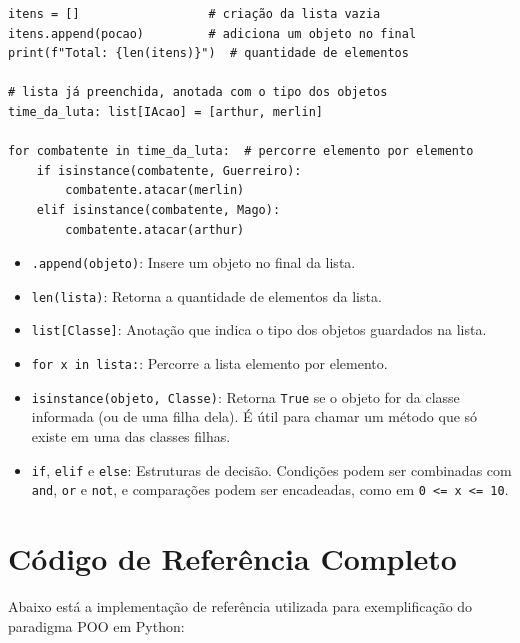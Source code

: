 \begin{lstlisting}[style=python]
itens = []                  # criação da lista vazia
itens.append(pocao)         # adiciona um objeto no final
print(f"Total: {len(itens)}")  # quantidade de elementos

# lista já preenchida, anotada com o tipo dos objetos
time_da_luta: list[IAcao] = [arthur, merlin]

for combatente in time_da_luta:  # percorre elemento por elemento
    if isinstance(combatente, Guerreiro):
        combatente.atacar(merlin)
    elif isinstance(combatente, Mago):
        combatente.atacar(arthur)
\end{lstlisting}

\begin{itemize}
    \item \texttt{.append(objeto)}: Insere um objeto no final da lista.
    \item \texttt{len(lista)}: Retorna a quantidade de elementos da lista.
    \item \texttt{list[Classe]}: Anotação que indica o tipo dos objetos guardados na lista.
    \item \texttt{for x in lista:}: Percorre a lista elemento por elemento.
    \item \texttt{isinstance(objeto, Classe)}: Retorna \texttt{True} se o objeto for da classe
    informada (ou de uma filha dela). É útil para chamar um método que só existe em uma das
    classes filhas.
    \item \texttt{if}, \texttt{elif} e \texttt{else}: Estruturas de decisão. Condições podem ser
    combinadas com \texttt{and}, \texttt{or} e \texttt{not}, e comparações podem ser
    encadeadas, como em \texttt{0 <= x <= 10}.
\end{itemize}

\section{Código de Referência Completo}

Abaixo está a implementação de referência utilizada para exemplificação do paradigma POO em
Python:

